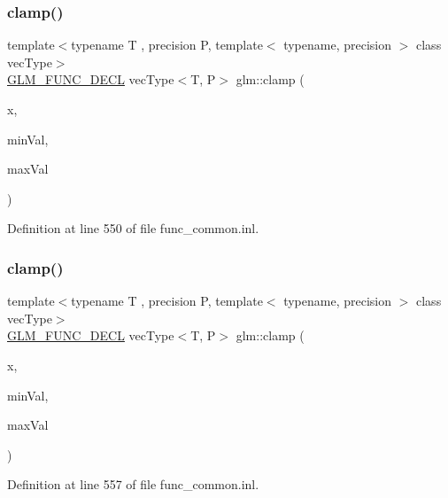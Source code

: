 \subsubsection{\texorpdfstring{clamp()}{clamp()}\hspace{0.1cm}{\footnotesize\ttfamily [2/3]}}
{\footnotesize\ttfamily template$<$typename T , precision P, template$<$ typename, precision $>$ class vec\+Type$>$ \\
\mbox{\hyperlink{setup_8hpp_ab2d052de21a70539923e9bcbf6e83a51}{G\+L\+M\+\_\+\+F\+U\+N\+C\+\_\+\+D\+E\+CL}} vec\+Type$<$T, P$>$ glm\+::clamp (\begin{DoxyParamCaption}\item[{vec\+Type$<$ T, P $>$ const \&}]{x,  }\item[{T}]{min\+Val,  }\item[{T}]{max\+Val }\end{DoxyParamCaption})}



Definition at line 550 of file func\+\_\+common.\+inl.

\mbox{\label{group__core__func__common_ga240b9ec68274f12a2c4b6debf8979d1c}} 
\subsubsection{\texorpdfstring{clamp()}{clamp()}\hspace{0.1cm}{\footnotesize\ttfamily [3/3]}}
{\footnotesize\ttfamily template$<$typename T , precision P, template$<$ typename, precision $>$ class vec\+Type$>$ \\
\mbox{\hyperlink{setup_8hpp_ab2d052de21a70539923e9bcbf6e83a51}{G\+L\+M\+\_\+\+F\+U\+N\+C\+\_\+\+D\+E\+CL}} vec\+Type$<$T, P$>$ glm\+::clamp (\begin{DoxyParamCaption}\item[{vec\+Type$<$ T, P $>$ const \&}]{x,  }\item[{vec\+Type$<$ T, P $>$ const \&}]{min\+Val,  }\item[{vec\+Type$<$ T, P $>$ const \&}]{max\+Val }\end{DoxyParamCaption})}



Definition at line 557 of file func\+\_\+common.\+inl.

\mbox{\label{group__core__func__common_gadc6a536a7bef046c3293d2ccad6d9ca2}} 

